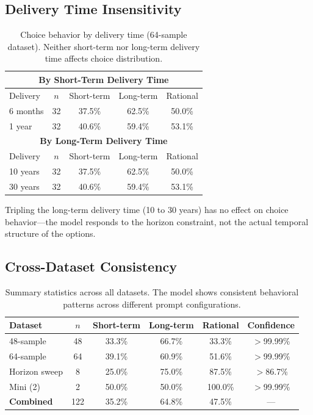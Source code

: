 \documentclass{article}
\begin{document}
\subsection{Delivery Time Insensitivity}

\begin{table}[h]
\caption{Choice behavior by delivery time (64-sample dataset). Neither short-term nor long-term delivery time affects choice distribution.}
\label{tab:time_sensitivity}
\centering
\begin{tabular}{lcccc}
\toprule
\multicolumn{5}{c}{\textbf{By Short-Term Delivery Time}} \\
\midrule
Delivery & $n$ & Short-term & Long-term & Rational \\
\midrule
6 months & 32 & 37.5\% & 62.5\% & 50.0\% \\
1 year & 32 & 40.6\% & 59.4\% & 53.1\% \\
\midrule
\multicolumn{5}{c}{\textbf{By Long-Term Delivery Time}} \\
\midrule
Delivery & $n$ & Short-term & Long-term & Rational \\
\midrule
10 years & 32 & 37.5\% & 62.5\% & 50.0\% \\
30 years & 32 & 40.6\% & 59.4\% & 53.1\% \\
\bottomrule
\end{tabular}
\end{table}

Tripling the long-term delivery time (10 to 30 years) has no effect on choice behavior---the model responds to the horizon constraint, not the actual temporal structure of the options.

\subsection{Cross-Dataset Consistency}

\begin{table}[h]
\caption{Summary statistics across all datasets. The model shows consistent behavioral patterns across different prompt configurations.}
\label{tab:cross_dataset}
\centering
\begin{tabular}{lccccc}
\toprule
Dataset & $n$ & Short-term & Long-term & Rational & Confidence \\
\midrule
48-sample & 48 & 33.3\% & 66.7\% & 33.3\% & $>$99.99\% \\
64-sample & 64 & 39.1\% & 60.9\% & 51.6\% & $>$99.99\% \\
Horizon sweep & 8 & 25.0\% & 75.0\% & 87.5\% & $>$86.7\% \\
Mini (2) & 2 & 50.0\% & 50.0\% & 100.0\% & $>$99.99\% \\
\midrule
\textbf{Combined} & 122 & 35.2\% & 64.8\% & 47.5\% & --- \\
\bottomrule
\end{tabular}
\end{table}
\end{document}
